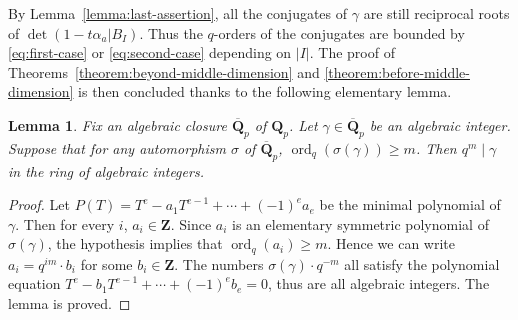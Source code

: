 \documentclass{amsart}
\numberwithin{equation}{section}
\theoremstyle{plain}
\newtheorem{lemma}[equation]{Lemma}
\theoremstyle{definition}
\renewcommand{\mathbb}{\mathbf}
\begin{document}
By Lemma~\ref{lemma:last-assertion},
all the conjugates of \(\gamma\) are still reciprocal roots of
\(\det(1-t\alpha_{a}| B_I)\). Thus the \(q\)-orders of the conjugates are bounded by
\eqref{eq:first-case} or \eqref{eq:second-case} depending on \(|I|\).
The proof of Theorems~\ref{theorem:beyond-middle-dimension}
and \ref{theorem:before-middle-dimension} is then concluded
thanks to the following elementary lemma.

\begin{lemma}
  \label{lemma:last}
  Fix an algebraic closure \(\overline{\mathbb{Q}}_p\) of \(\mathbb{Q}_p\).
  Let \(\gamma \in \overline{\mathbb{Q}}_{p}\) be an algebraic integer. Suppose
  that for any automorphism \(\sigma\) of \(\overline{\mathbb{Q}}_{p}\),
  \(\operatorname{ord}_q(\sigma(\gamma))\geq m\). Then \(q^{m} \mid \gamma\)
  in the ring of algebraic integers.
\end{lemma}

\begin{proof}
  Let \(P(T) = T^{e} - a_{1}T^{e-1} + \cdots + (-1)^{e}a_{e}\) be the minimal
  polynomial of \(\gamma\). Then for every \(i\), \(a_{i} \in \mathbb{Z}\).
  Since \(a_i\) is an elementary symmetric polynomial of \(\sigma(\gamma)\),
  the hypothesis implies that \(\operatorname{ord}_q(a_i) \geq m\).
  Hence we can write \(a_i = q^{im} \cdot b_i\)
  for some \(b_i \in \mathbb{Z}\). The numbers \(\sigma(\gamma)\cdot q^{-m}\)
  all satisfy the  polynomial equation \(T^e-b_1T^{e-1} + \cdots + (-1)^{e}b_{e} = 0\),
  thus are all algebraic integers. The lemma is proved.
\end{proof}
\end{document}
